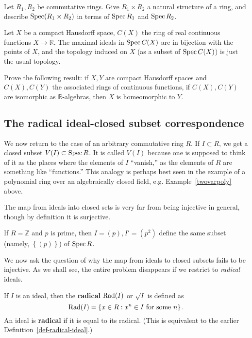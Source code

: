 \begin{exercise} 
Let $R_1, R_2$ be commutative rings. Give $R_1 \times R_2$ a natural structure
of a ring, and describe $\operatorname{Spec}( R_1 \times R_2)$ in terms of $\operatorname{Spec} R_1$ and
$\operatorname{Spec} R_2$.
\end{exercise} 


\begin{exercise} 
Let $X$ be a compact Hausdorff space, $C(X)$ the ring of real continuous
functions $X \to \mathbb{R}$. 
The maximal ideals in $\operatorname{Spec} C(X)$ are in bijection with the points of $X$,
and the topology induced on $X $ (as a subset of $\operatorname{Spec} C(X)$) is just the usual topology.
\end{exercise}

\begin{exercise}
Prove the following result: if $X, Y$ are compact Hausdorff spaces and $C(X),
C(Y)$ the associated rings of continuous functions, if $C(X), C(Y)$ are
isomorphic as $\mathbb{R}$-algebras, then $X$ is homeomorphic to $Y$.
\end{exercise} 


\subsection{The radical ideal-closed subset correspondence}

We now return to the case of an arbitrary  commutative ring $R$. If $I \subset R$, we get a closed
subset $V(I) \subset \operatorname{Spec} R$.  It is called $V(I)$ because one is supposed to
think of it as the places where the elements of $I$ ``vanish,'' as the
elements of $R$ are something like ``functions.'' This analogy is perhaps best
seen in the example of a polynomial ring over an algebraically closed field,
e.g. Example~\ref{twovarpoly} above.

The map from ideals into closed sets is very far from being injective in
general, though by definition it is surjective.

\begin{example} 
If $R = \mathbb{Z}$ and $p$ is prime, then $I = (p), I' = (p^2)$ define the
same subset (namely, $\left\{(p)\right\}$) of
$\operatorname{Spec} R$. 
\end{example} 

We now ask the question of why the map from ideals to closed subsets fails to
be injective. As we shall see, the entire problem disappears if we restrict to
\emph{radical} ideals.

\begin{definition} 
If $I$ is an ideal, then the \textbf{radical} $\operatorname{Rad}(I)  $ or $ \sqrt{I}$ is
defined as $$\operatorname{Rad}(I) =
\left\{x \in R: x^n \in I \ \mathrm{for} \ \mathrm{some} \ n \right\}.$$
An ideal is \textbf{radical} if it is equal to its radical. (This is
equivalent to the earlier Definition~\ref{def-radical-ideal}.) 
\end{definition} 

